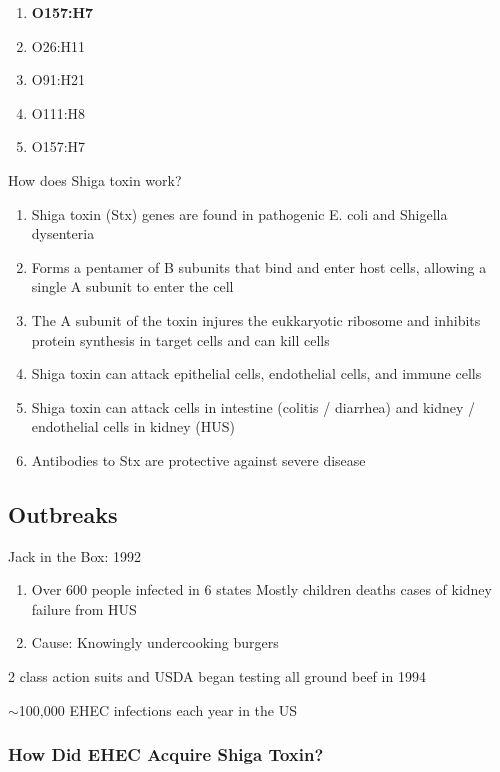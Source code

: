 \documentclass{notes}
\begin{document}
\begin{enumerate}
    \item \textbf{O157:H7}
    \item O26:H11
    \item O91:H21
    \item O111:H8
    \item O157:H7
\end{enumerate}

How does Shiga toxin work?

\begin{enumerate}
    \item Shiga toxin (Stx) genes are found in pathogenic E. coli and Shigella dysenteria
    \item Forms a pentamer of B subunits that bind and enter host cells, allowing a single A subunit to enter the cell
    \item The A subunit of the toxin injures the eukkaryotic ribosome and inhibits protein synthesis in target cells and can kill cells
    \item Shiga toxin can attack epithelial cells, endothelial cells, and immune cells
    \item Shiga toxin can attack cells in intestine (colitis / diarrhea) and kidney / endothelial cells in kidney (HUS)
    \item Antibodies to Stx are protective against severe disease
\end{enumerate}


\subsection*{Outbreaks}
Jack in the Box: 1992
\begin{enumerate}
    \item Over 600 people infected in 6 states
    \subitem Mostly children
     deaths
     cases of kidney failure from HUS
    \item Cause: Knowingly undercooking burgers
\end{enumerate}

2 class action suits and USDA began testing all ground beef in 1994

\(\sim\)100,000 EHEC infections each year in the US

\subsubsection*{How Did EHEC Acquire Shiga Toxin?}
\end{document}
